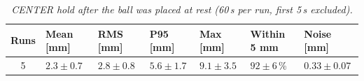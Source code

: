 \begin{table}[H]
\centering
\begin{tabularx}{\textwidth}{|c|X|X|X|X|X|X|}
\hline
\textbf{Runs} & \textbf{Mean [mm]} & \textbf{RMS [mm]} & \textbf{P95 [mm]} & \textbf{Max [mm]} & \textbf{Within 5 mm} & \textbf{Noise [mm]} \\ \hline
5 & $2.3 \pm 0.7$ & $2.8 \pm 0.8$ & $5.6 \pm 1.7$ & $9.1 \pm 3.5$ & $92 \pm 6$\,\% & $0.33 \pm 0.07$ \\ \hline
\end{tabularx}
\caption{\textit{CENTER hold after the ball was placed at rest (60\,s per run, first 5\,s excluded).}}
\label{tab:test_center}
\end{table}
